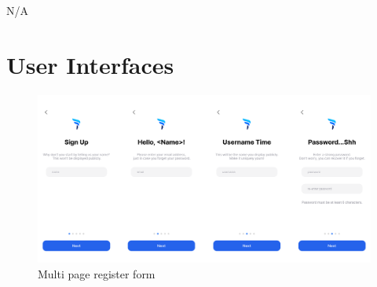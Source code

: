 \documentclass[12pt, titlepage]{article}
\begin{document}
	N/A
	
	
	
	
	\section{User Interfaces}

  \begin{figure}[H]
		\centering
		\includegraphics[width=\linewidth,keepaspectratio]{register_stack}
		\caption{Multi page register form}
	\end{figure}
\end{document}
